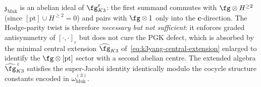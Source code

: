 \begin{theorem}
\begin{enumerate}[label=\textup{(\roman*)}]
\end{enumerate}
$\mathfrak z_{\mathrm{Muk}}$ is an abelian ideal of
$\fg^{\varepsilon}_{K3}$: the first summand commutes with
$\fg \otimes H^{\geq 2}$ (since $[\mathrm{pt}] \cup H^{\geq 2} = 0$)
and pairs with $\fg \otimes 1$ only into the $\mathbf c$-direction.
The Hodge-parity twist is therefore \emph{necessary but not
sufficient}: it enforces graded antisymmetry of $[\cdot, \cdot]_
{\varepsilon}$ but does not cure the PGK defect, which is absorbed
by the minimal central extension $\widehat{\fg}_{K3}$
of~\eqref{eq:k3yang-central-extension} enlarged to identify the
$\fg \otimes [\mathrm{pt}]$ sector with a second abelian centre.
The extended algebra $\widehat{\fg}_{K3}^{\,\varepsilon}$ satisfies
the super-Jacobi identity identically modulo the cocycle structure
constants encoded in $\omega^{(3)}_{\mathrm{Muk}}$.
\end{theorem}

